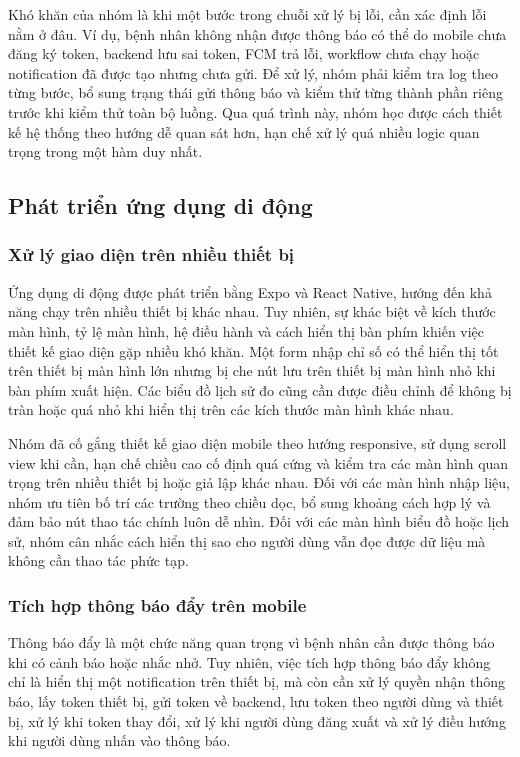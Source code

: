 \par Khó khăn của nhóm là khi một bước trong chuỗi xử lý bị lỗi, cần xác định lỗi nằm ở đâu. Ví dụ, bệnh nhân không nhận được thông báo có thể do mobile chưa đăng ký token, backend lưu sai token, FCM trả lỗi, workflow chưa chạy hoặc notification đã được tạo nhưng chưa gửi. Để xử lý, nhóm phải kiểm tra log theo từng bước, bổ sung trạng thái gửi thông báo và kiểm thử từng thành phần riêng trước khi kiểm thử toàn bộ luồng. Qua quá trình này, nhóm học được cách thiết kế hệ thống theo hướng dễ quan sát hơn, hạn chế xử lý quá nhiều logic quan trọng trong một hàm duy nhất.

\subsection{Phát triển ứng dụng di động}

\subsubsection{Xử lý giao diện trên nhiều thiết bị}
\par Ứng dụng di động được phát triển bằng Expo và React Native, hướng đến khả năng chạy trên nhiều thiết bị khác nhau. Tuy nhiên, sự khác biệt về kích thước màn hình, tỷ lệ màn hình, hệ điều hành và cách hiển thị bàn phím khiến việc thiết kế giao diện gặp nhiều khó khăn. Một form nhập chỉ số có thể hiển thị tốt trên thiết bị màn hình lớn nhưng bị che nút lưu trên thiết bị màn hình nhỏ khi bàn phím xuất hiện. Các biểu đồ lịch sử đo cũng cần được điều chỉnh để không bị tràn hoặc quá nhỏ khi hiển thị trên các kích thước màn hình khác nhau.

\par Nhóm đã cố gắng thiết kế giao diện mobile theo hướng responsive, sử dụng scroll view khi cần, hạn chế chiều cao cố định quá cứng và kiểm tra các màn hình quan trọng trên nhiều thiết bị hoặc giả lập khác nhau. Đối với các màn hình nhập liệu, nhóm ưu tiên bố trí các trường theo chiều dọc, bổ sung khoảng cách hợp lý và đảm bảo nút thao tác chính luôn dễ nhìn. Đối với các màn hình biểu đồ hoặc lịch sử, nhóm cân nhắc cách hiển thị sao cho người dùng vẫn đọc được dữ liệu mà không cần thao tác phức tạp.

\subsubsection{Tích hợp thông báo đẩy trên mobile}
\par Thông báo đẩy là một chức năng quan trọng vì bệnh nhân cần được thông báo khi có cảnh báo hoặc nhắc nhở. Tuy nhiên, việc tích hợp thông báo đẩy không chỉ là hiển thị một notification trên thiết bị, mà còn cần xử lý quyền nhận thông báo, lấy token thiết bị, gửi token về backend, lưu token theo người dùng và thiết bị, xử lý khi token thay đổi, xử lý khi người dùng đăng xuất và xử lý điều hướng khi người dùng nhấn vào thông báo.


